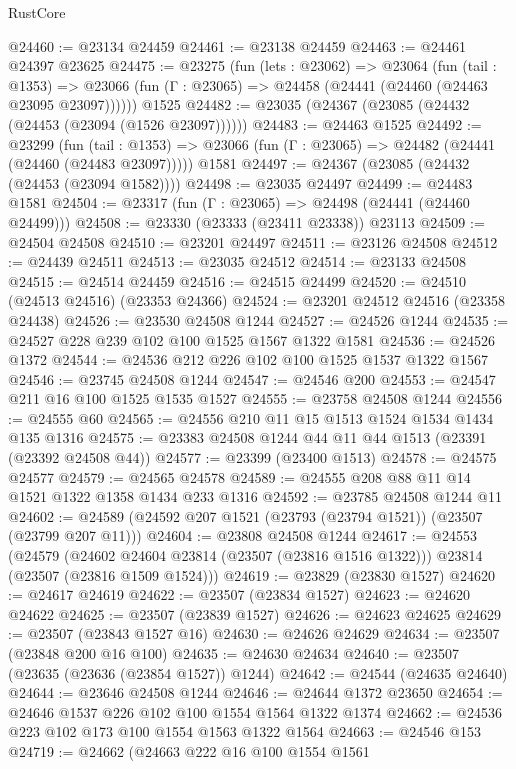 \begin{lexlean}{RustCore}
\begin{coremodule}
@24460 := @23134 @24459
@24461 := @23138 @24459
@24463 := @24461 @24397 @23625
@24475 := @23275
    (fun (lets : @23062) =>
    @23064
      (fun (tail : @1353) =>
      @23066 (fun (Γ : @23065) => @24458 (@24441 (@24460 (@24463 @23095 @23097))))))
    @1525
@24482 := @23035 (@24367 (@23085 (@24432 (@24453 (@23094 (@1526 @23097))))))
@24483 := @24463 @1525
@24492 := @23299
    (fun (tail : @1353) => @23066 (fun (Γ : @23065) => @24482 (@24441 (@24460 (@24483 @23097)))))
    @1581
@24497 := @24367 (@23085 (@24432 (@24453 (@23094 @1582))))
@24498 := @23035 @24497
@24499 := @24483 @1581
@24504 := @23317 (fun (Γ : @23065) => @24498 (@24441 (@24460 @24499)))
@24508 := @23330 (@23333 (@23411 @23338)) @23113
@24509 := @24504 @24508
@24510 := @23201 @24497
@24511 := @23126 @24508
@24512 := @24439 @24511
@24513 := @23035 @24512
@24514 := @23133 @24508
@24515 := @24514 @24459
@24516 := @24515 @24499
@24520 := @24510 (@24513 @24516) (@23353 @24366)
@24524 := @23201 @24512 @24516 (@23358 @24438)
@24526 := @23530 @24508 @1244
@24527 := @24526 @1244
@24535 := @24527 @228 @239 @102 @100 @1525 @1567 @1322 @1581
@24536 := @24526 @1372
@24544 := @24536 @212 @226 @102 @100 @1525 @1537 @1322 @1567
@24546 := @23745 @24508 @1244
@24547 := @24546 @200
@24553 := @24547 @211 @16 @100 @1525 @1535 @1527
@24555 := @23758 @24508 @1244
@24556 := @24555 @60
@24565 := @24556 @210 @11 @15 @1513 @1524 @1534 @1434 @135 @1316
@24575 := @23383 @24508 @1244 @44 @11 @44 @1513 (@23391 (@23392 @24508 @44))
@24577 := @23399 (@23400 @1513)
@24578 := @24575 @24577
@24579 := @24565 @24578
@24589 := @24555 @208 @88 @11 @14 @1521 @1322 @1358 @1434 @233 @1316
@24592 := @23785 @24508 @1244 @11
@24602 := @24589 (@24592 @207 @1521 (@23793 (@23794 @1521)) (@23507 (@23799 @207 @11)))
@24604 := @23808 @24508 @1244
@24617 := @24553
    (@24579
      (@24602 @24604 @23814 (@23507 (@23816 @1516 @1322)))
      @23814
      (@23507 (@23816 @1509 @1524)))
@24619 := @23829 (@23830 @1527)
@24620 := @24617 @24619
@24622 := @23507 (@23834 @1527)
@24623 := @24620 @24622
@24625 := @23507 (@23839 @1527)
@24626 := @24623 @24625
@24629 := @23507 (@23843 @1527 @16)
@24630 := @24626 @24629
@24634 := @23507 (@23848 @200 @16 @100)
@24635 := @24630 @24634
@24640 := @23507 (@23635 (@23636 (@23854 @1527)) @1244)
@24642 := @24544 (@24635 @24640)
@24644 := @23646 @24508 @1244
@24646 := @24644 @1372 @23650
@24654 := @24646 @1537 @226 @102 @100 @1554 @1564 @1322 @1374
@24662 := @24536 @223 @102 @173 @100 @1554 @1563 @1322 @1564
@24663 := @24546 @153
@24719 := @24662
    (@24663
      @222
      @16
      @100
      @1554
      @1561

\end{coremodule}
\end{lexlean}
